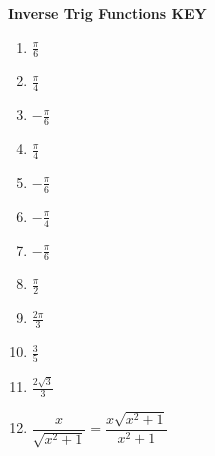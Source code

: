 \documentclass{article}
\begin{document}
\newpage


\textbf{Inverse Trig Functions KEY}

\begin{enumerate}
    \item $\frac{\pi}{6}$
    \item $\frac{\pi}{4}$
    \item $-\frac{\pi}{6}$
    \item $\frac{\pi}{4}$
    \item $-\frac{\pi}{6}$
    \item $-\frac{\pi}{4}$
    \item $-\frac{\pi}{6}$
    \item $\frac{\pi}{2}$
    \item $\frac{2\pi}{3}$
    \item $\frac{3}{5}$
    \item $\frac{2\sqrt{3}}{3}$
    \item $\dfrac{x}{\sqrt{x^2+1}} = \dfrac{x\sqrt{x^2+1}}{x^2+1}$
\end{enumerate}
\end{document}
